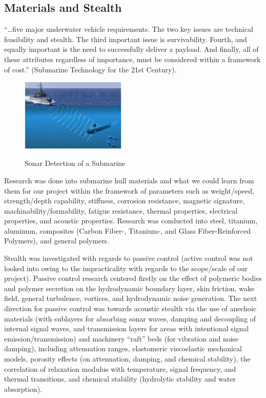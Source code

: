 \documentclass{report}
\begin{document}
\subsection{Materials and Stealth}

“…five major underwater vehicle requirements.  The two key issues are technical feasibility and stealth.  The third important issue is survivability.  Fourth, and equally important is the need to successfully deliver a payload.  And finally, all of these attributes regardless of importance, must be considered within a framework of cost.” (Submarine Technology for the 21st Century).\par
\begin{figure}[h]
\centering
\includegraphics[width=5cm]{"Submarine Stealth"}
\caption{Sonar Detection of a Submarine}
\cite{sonar}
\end{figure}
Research was done into submarine hull materials and what we could learn from them for our project within the framework of parameters such as weight/speed, strength/depth capability, stiffness, corrosion resistance, magnetic signature, machinability/formability, fatigue resistance, thermal properties, electrical properties, and acoustic properties.  Research was conducted into steel, titanium, aluminum, composites (Carbon Fiber-, Titanium-, and Glass Fiber-Reinforced Polymers), and general polymers.\par
\par Stealth was investigated with regards to passive control (active control was not looked into owing to the impracticality with regards to the scope/scale of our project).  Passive control research centered firstly on the effect of polymeric bodies and polymer secretion on the hydrodynamic boundary layer, skin friction, wake field, general turbulence, vortices, and hydrodynamic noise generation.  The next direction for passive control was towards acoustic stealth via the use of anechoic materials (with sublayers for absorbing sonar waves, damping and decoupling of internal signal waves, and transmission layers for areas with intentional signal emission/transmission) and machinery “raft” beds (for vibration and noise damping), including attenuation ranges, elastomeric viscoelastic mechanical models, porosity effects (on attenuation, damping, and chemical stability), the correlation of relaxation modulus with temperature, signal frequency, and thermal transitions, and chemical stability (hydrolytic stability and water absorption).
\end{document}

